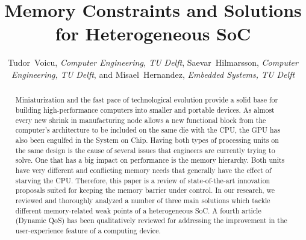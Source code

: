 \documentclass[journal]{IEEEtran}
\begin{document}
\title{Memory Constraints and Solutions \\ for Heterogeneous SoC}
\author{Tudor~Voicu, \textit{Computer Engineering, TU Delft}, Saevar~Hilmarsson, \textit{Computer Engineering, TU Delft}, and Misael~Hernandez, \textit{Embedded Systems, TU Delft}}

\markboth{}%
{}

\maketitle

\begin{abstract}
Miniaturization and the fast pace of technological evolution provide a solid base for building high-performance computers into smaller and portable devices. As almost every new shrink in manufacturing node allows a new functional block from the computer's architecture to be included on the same die with the CPU, the GPU has also been engulfed in the System on Chip. Having both types of processing units on the same design is the cause of several issues that engineers are currently trying to solve. One that has a big impact on performance is the memory hierarchy. Both units have very different and conflicting memory needs that generally have the effect of starving the CPU. Therefore, this paper is a review of state-of-the-art innovation proposals suited for keeping the memory barrier under control. In our research, we reviewed and thoroughly analyzed a number of three main solutions which tackle different memory-related weak points of a heterogeneous SoC. A fourth article (Dynamic QoS) has been qualitatively reviewed for addressing the improvement in the user-experience feature of a computing device.
\end{abstract}


\IEEEpeerreviewmaketitle
\end{document}
